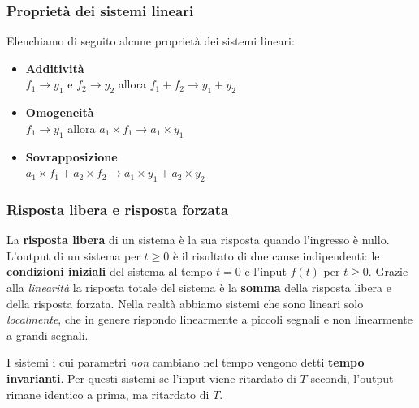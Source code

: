 \documentclass[a4paper, titlepage]{article}
\begin{document}
\subsubsection{Proprietà dei sistemi lineari}
Elenchiamo di seguito alcune proprietà dei sistemi lineari:
\begin{itemize}
	\item \textbf{Additività}\\
	$f_{1} \rightarrow y_{1}$ e $f_{2} \rightarrow y_{2}$ allora $f_{1} +f_{2} \rightarrow y_{1}+y_{2}$
	\item \textbf{Omogeneità}\\
	$f_{1} \rightarrow y_{1}$ allora $a_{1} \times f_{1}\rightarrow a_{1}\times y_{1}$
	\item \textbf{Sovrapposizione}\\
	$a_{1} \times f_{1} + a_{2}\times f_{2} \rightarrow a_{1}\times y_{1}+a_{2}\times y_{2}$
\end{itemize}

\subsubsection{Risposta libera e risposta forzata}
La \textbf{risposta libera} di un sistema è la sua risposta quando l'ingresso è nullo.
L'output di un sistema per $t\geq0$ è il risultato di due cause indipendenti: le \textbf{condizioni iniziali} del sistema al tempo $t=0$ e l'input $f(t)$ per $t\geq0$.
Grazie alla \textit{linearità} la risposta totale del sistema è la \textbf{somma} della risposta libera e della risposta forzata.
Nella realtà abbiamo sistemi che sono lineari solo \textit{localmente}, che in genere rispondo linearmente a piccoli segnali e non linearmente a grandi segnali.
\begin{center}
\end{center}

I sistemi i cui parametri \textit{non} cambiano nel tempo vengono detti \textbf{tempo invarianti}.
Per questi sistemi se l'input viene ritardato di $T$ secondi, l'output rimane identico a prima, ma ritardato di $T$.
\end{document}

